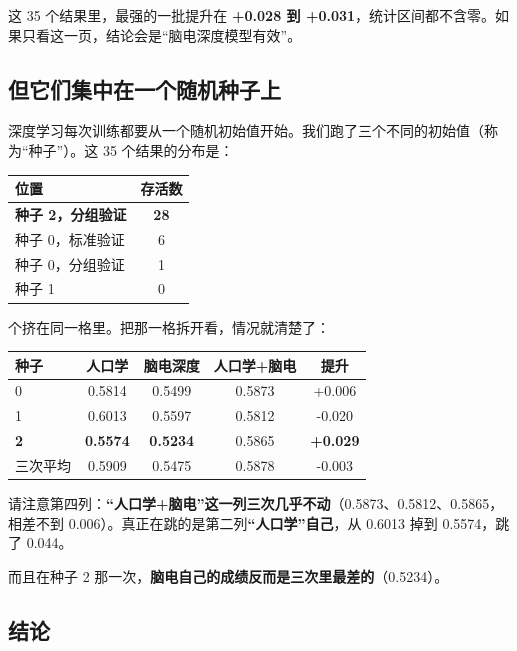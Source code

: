 \documentclass[UTF8,12pt,a4paper]{ctexart}
\newcommand{\key}[1]{\textbf{\textcolor{blue!45!black}{#1}}}
\begin{document}
这 35 个结果里，最强的一批提升在 \key{+0.028 到 +0.031}，统计区间都不含零。如果只看这一页，结论会是“脑电深度模型有效”。

\subsection{但它们集中在一个随机种子上}

深度学习每次训练都要从一个随机初始值开始。我们跑了三个不同的初始值（称为“种子”）。这 35 个结果的分布是：

\begin{center}
\begin{tabular}{@{}lc@{}}
\toprule
\textbf{位置} & \textbf{存活数} \\
\midrule
\textbf{种子 2，分组验证} & \textbf{28} \\
种子 0，标准验证 & 6 \\
种子 0，分组验证 & 1 \\
种子 1 & 0 \\
\bottomrule
\end{tabular}
\end{center}

 个挤在同一格里。把那一格拆开看，情况就清楚了：

\begin{center}
\begin{tabular}{@{}lcccc@{}}
\toprule
\textbf{种子} & \textbf{人口学} & \textbf{脑电深度} & \textbf{人口学+脑电} & \textbf{提升} \\
\midrule
0 & 0.5814 & 0.5499 & 0.5873 & +0.006 \\
1 & 0.6013 & 0.5597 & 0.5812 & -0.020 \\
\textbf{2} & \textbf{0.5574} & \textbf{0.5234} & 0.5865 & \textbf{+0.029} \\
\midrule
三次平均 & 0.5909 & 0.5475 & 0.5878 & -0.003 \\
\bottomrule
\end{tabular}
\end{center}

\noindent 请注意第四列：\key{“人口学+脑电”这一列三次几乎不动}（0.5873、0.5812、0.5865，相差不到 0.006）。真正在跳的是第二列\key{“人口学”自己}，从 0.6013 掉到 0.5574，跳了 0.044。

而且在种子 2 那一次，\key{脑电自己的成绩反而是三次里最差的}（0.5234）。

\subsection{结论}
\end{document}
